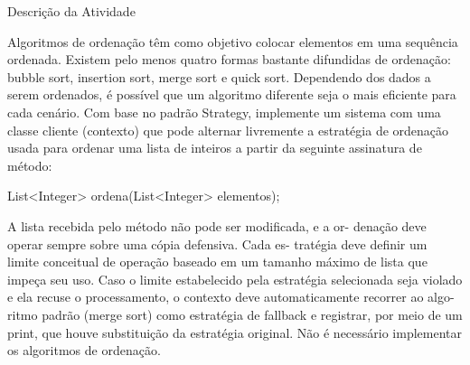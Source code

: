 Descrição da Atividade

Algoritmos de ordenação têm como objetivo colocar elementos
em uma sequência ordenada. Existem pelo menos quatro formas
bastante difundidas de ordenação: bubble sort, insertion sort, merge
sort e quick sort. Dependendo dos dados a serem ordenados, é
possível que um algoritmo diferente seja o mais eficiente para cada
cenário. Com base no padrão Strategy, implemente um sistema
com uma classe cliente (contexto) que pode alternar livremente a
estratégia de ordenação usada para ordenar uma lista de inteiros a
partir da seguinte assinatura de método:

List<Integer> ordena(List<Integer> elementos);

A lista recebida pelo método não pode ser modificada, e a or-
denação deve operar sempre sobre uma cópia defensiva. Cada es-
tratégia deve definir um limite conceitual de operação baseado em
um tamanho máximo de lista que impeça seu uso. Caso o limite
estabelecido pela estratégia selecionada seja violado e ela recuse o
processamento, o contexto deve automaticamente recorrer ao algo-
ritmo padrão (merge sort) como estratégia de fallback e registrar,
por meio de um print, que houve substituição da estratégia original.
Não é necessário implementar os algoritmos de ordenação.
